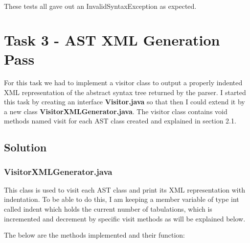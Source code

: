 \documentclass{article}
\begin{document}
				These tests all gave out an InvalidSyntaxException as expected.
				
				
			
				\section{Task 3 - AST XML Generation Pass}
				
				For this task we had to implement a visitor class to output a properly indented XML representation of the abstract syntax tree returned by the parser. I started this task by creating an interface \textbf{Visitor.java} so that then I could extend it by a new class \textbf{VisitorXMLGenerator.java}. The visitor class contains void methods named visit for each AST class created and explained in section 2.1.
				
				\subsection{Solution}
				\subsubsection{VisitorXMLGenerator.java}
				This class is used to visit each AST class and print its XML representation with indentation. To be able to do this, I am keeping a member variable of type int called indent which holds the current number of tabulations, which is incremented and decrement by specific visit methods as will be explained below.
				
				The below are the methods implemented and their function:
				
\end{document}
